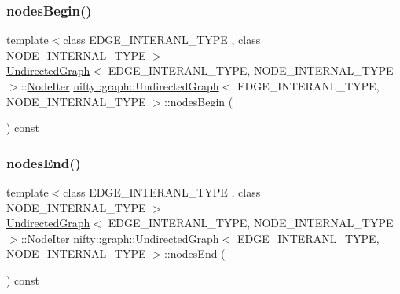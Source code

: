 \mbox{\label{classnifty_1_1graph_1_1UndirectedGraph_aa8d42d0d15cc214e1da4a5c8d0ae4e3e}} 
\subsubsection{\texorpdfstring{nodes\+Begin()}{nodesBegin()}}
{\footnotesize\ttfamily template$<$class E\+D\+G\+E\+\_\+\+I\+N\+T\+E\+R\+A\+N\+L\+\_\+\+T\+Y\+PE , class N\+O\+D\+E\+\_\+\+I\+N\+T\+E\+R\+N\+A\+L\+\_\+\+T\+Y\+PE $>$ \\
\hyperlink{classnifty_1_1graph_1_1UndirectedGraph}{Undirected\+Graph}$<$ E\+D\+G\+E\+\_\+\+I\+N\+T\+E\+R\+A\+N\+L\+\_\+\+T\+Y\+PE, N\+O\+D\+E\+\_\+\+I\+N\+T\+E\+R\+N\+A\+L\+\_\+\+T\+Y\+PE $>$\+::\hyperlink{classnifty_1_1graph_1_1UndirectedGraph_aac54e4ad3a525489e9b29c1bd4c92c88}{Node\+Iter} \hyperlink{classnifty_1_1graph_1_1UndirectedGraph}{nifty\+::graph\+::\+Undirected\+Graph}$<$ E\+D\+G\+E\+\_\+\+I\+N\+T\+E\+R\+A\+N\+L\+\_\+\+T\+Y\+PE, N\+O\+D\+E\+\_\+\+I\+N\+T\+E\+R\+N\+A\+L\+\_\+\+T\+Y\+PE $>$\+::nodes\+Begin (\begin{DoxyParamCaption}{ }\end{DoxyParamCaption}) const}

\mbox{\label{classnifty_1_1graph_1_1UndirectedGraph_a8e3e13d42c2770d0d739fa8d65b22c6f}} 
\subsubsection{\texorpdfstring{nodes\+End()}{nodesEnd()}}
{\footnotesize\ttfamily template$<$class E\+D\+G\+E\+\_\+\+I\+N\+T\+E\+R\+A\+N\+L\+\_\+\+T\+Y\+PE , class N\+O\+D\+E\+\_\+\+I\+N\+T\+E\+R\+N\+A\+L\+\_\+\+T\+Y\+PE $>$ \\
\hyperlink{classnifty_1_1graph_1_1UndirectedGraph}{Undirected\+Graph}$<$ E\+D\+G\+E\+\_\+\+I\+N\+T\+E\+R\+A\+N\+L\+\_\+\+T\+Y\+PE, N\+O\+D\+E\+\_\+\+I\+N\+T\+E\+R\+N\+A\+L\+\_\+\+T\+Y\+PE $>$\+::\hyperlink{classnifty_1_1graph_1_1UndirectedGraph_aac54e4ad3a525489e9b29c1bd4c92c88}{Node\+Iter} \hyperlink{classnifty_1_1graph_1_1UndirectedGraph}{nifty\+::graph\+::\+Undirected\+Graph}$<$ E\+D\+G\+E\+\_\+\+I\+N\+T\+E\+R\+A\+N\+L\+\_\+\+T\+Y\+PE, N\+O\+D\+E\+\_\+\+I\+N\+T\+E\+R\+N\+A\+L\+\_\+\+T\+Y\+PE $>$\+::nodes\+End (\begin{DoxyParamCaption}{ }\end{DoxyParamCaption}) const}

